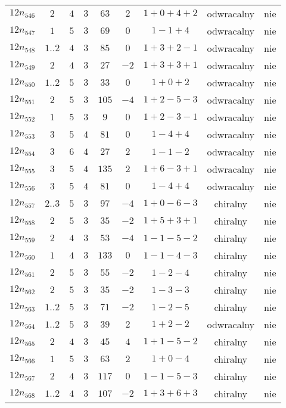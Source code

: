 \begin{longtable}{ccccccccc}
$12n_{546}$ & $2$ & $4$ & $3$ & $63$ & $2$ & $1+0+4+2$ & odwracalny & nie \\
$12n_{547}$ & $1$ & $5$ & $3$ & $69$ & $0$ & $1-1+4$ & odwracalny & nie \\
$12n_{548}$ & $1..2$ & $4$ & $3$ & $85$ & $0$ & $1+3+2-1$ & odwracalny & nie \\
$12n_{549}$ & $2$ & $4$ & $3$ & $27$ & $-2$ & $1+3+3+1$ & odwracalny & nie \\
$12n_{550}$ & $1..2$ & $5$ & $3$ & $33$ & $0$ & $1+0+2$ & odwracalny & nie \\
$12n_{551}$ & $2$ & $5$ & $3$ & $105$ & $-4$ & $1+2-5-3$ & odwracalny & nie \\
$12n_{552}$ & $1$ & $5$ & $3$ & $9$ & $0$ & $1+2-3-1$ & odwracalny & nie \\
$12n_{553}$ & $3$ & $5$ & $4$ & $81$ & $0$ & $1-4+4$ & odwracalny & nie \\
$12n_{554}$ & $3$ & $6$ & $4$ & $27$ & $2$ & $1-1-2$ & odwracalny & nie \\
$12n_{555}$ & $3$ & $5$ & $4$ & $135$ & $2$ & $1+6-3+1$ & odwracalny & nie \\
$12n_{556}$ & $3$ & $5$ & $4$ & $81$ & $0$ & $1-4+4$ & odwracalny & nie \\
$12n_{557}$ & $2..3$ & $5$ & $3$ & $97$ & $-4$ & $1+0-6-3$ & chiralny & nie \\
$12n_{558}$ & $2$ & $5$ & $3$ & $35$ & $-2$ & $1+5+3+1$ & chiralny & nie \\
$12n_{559}$ & $2$ & $4$ & $3$ & $53$ & $-4$ & $1-1-5-2$ & chiralny & nie \\
$12n_{560}$ & $1$ & $4$ & $3$ & $133$ & $0$ & $1-1-4-3$ & chiralny & nie \\
$12n_{561}$ & $2$ & $5$ & $3$ & $55$ & $-2$ & $1-2-4$ & chiralny & nie \\
$12n_{562}$ & $2$ & $5$ & $3$ & $35$ & $-2$ & $1-3-3$ & chiralny & nie \\
$12n_{563}$ & $1..2$ & $5$ & $3$ & $71$ & $-2$ & $1-2-5$ & chiralny & nie \\
$12n_{564}$ & $1..2$ & $5$ & $3$ & $39$ & $2$ & $1+2-2$ & odwracalny & nie \\
$12n_{565}$ & $2$ & $4$ & $3$ & $45$ & $4$ & $1+1-5-2$ & chiralny & nie \\
$12n_{566}$ & $1$ & $5$ & $3$ & $63$ & $2$ & $1+0-4$ & chiralny & nie \\
$12n_{567}$ & $2$ & $4$ & $3$ & $117$ & $0$ & $1-1-5-3$ & chiralny & nie \\
$12n_{568}$ & $1..2$ & $4$ & $3$ & $107$ & $-2$ & $1+3+6+3$ & chiralny & nie \\

\end{longtable}
